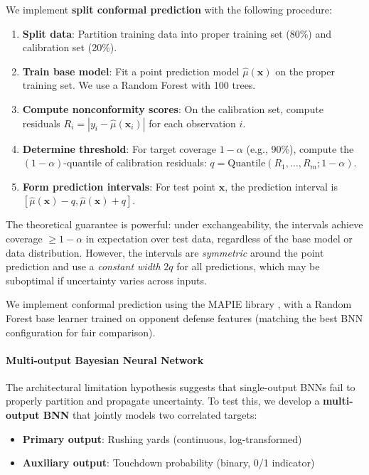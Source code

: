 We implement \textbf{split conformal prediction} with the following procedure:

\begin{enumerate}
    \item \textbf{Split data}: Partition training data into proper training set (80\%) and calibration set (20\%).
    \item \textbf{Train base model}: Fit a point prediction model $\hat{\mu}(\mathbf{x})$ on the proper training set. We use a Random Forest with 100 trees.
    \item \textbf{Compute nonconformity scores}: On the calibration set, compute residuals $R_i = |y_i - \hat{\mu}(\mathbf{x}_i)|$ for each observation $i$.
    \item \textbf{Determine threshold}: For target coverage $1 - \alpha$ (e.g., 90\%), compute the $(1-\alpha)$-quantile of calibration residuals: $q = \text{Quantile}(R_1, \ldots, R_m; 1-\alpha)$.
    \item \textbf{Form prediction intervals}: For test point $\mathbf{x}$, the prediction interval is $[\hat{\mu}(\mathbf{x}) - q, \hat{\mu}(\mathbf{x}) + q]$.
\end{enumerate}

The theoretical guarantee is powerful: under exchangeability, the intervals achieve coverage $\geq 1 - \alpha$ in expectation over test data, regardless of the base model or data distribution. However, the intervals are \textit{symmetric} around the point prediction and use a \textit{constant width} $2q$ for all predictions, which may be suboptimal if uncertainty varies across inputs.

We implement conformal prediction using the MAPIE library \citep{taquet2021mapie}, with a Random Forest base learner trained on opponent defense features (matching the best BNN configuration for fair comparison).

\paragraph{Multi-output Bayesian Neural Network}

The architectural limitation hypothesis suggests that single-output BNNs fail to properly partition and propagate uncertainty. To test this, we develop a \textbf{multi-output BNN} that jointly models two correlated targets:

\begin{itemize}
    \item \textbf{Primary output}: Rushing yards (continuous, log-transformed)
    \item \textbf{Auxiliary output}: Touchdown probability (binary, 0/1 indicator)
\end{itemize}

